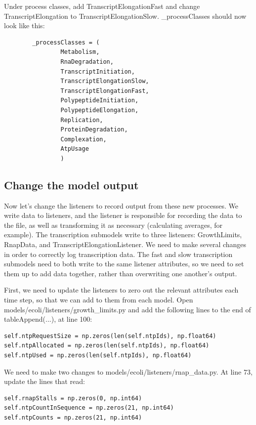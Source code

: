 \documentclass[12pt]{article}
\begin{document}
Under process classes, add TranscriptElongationFast and change TranscriptElongation to TranscriptElongationSlow. \_processClasses should now look like this:


\begin{lstlisting}
        _processClasses = (
                Metabolism,
                RnaDegradation,
                TranscriptInitiation,
                TranscriptElongationSlow,
                TranscriptElongationFast,
                PolypeptideInitiation,
                PolypeptideElongation,
                Replication,
                ProteinDegradation,
                Complexation,
                AtpUsage
                )
\end{lstlisting}

\subsection{Change the model output}

Now let’s change the listeners to record output from these new processes. We write data to listeners, and the listener is responsible for recording the data to the file, as well as transforming it as necessary (calculating averages, for example). The transcription submodels write to three listeners: GrowthLimits, RnapData, and TranscriptElongationListener. We need to make several changes in order to correctly log transcription data. The fast and slow transcription submodels need to both write to the same listener attributes, so we need to set them up to add data together, rather than overwriting one another's output.

First, we need to update the listeners to zero out the relevant attributes each time step, so that we can add to them from each model. Open models/ecoli/listeners/growth_limits.py and add the following lines to the end of tableAppend(...), at line 100:

\lstset{language=Python}
\begin{lstlisting}
self.ntpRequestSize = np.zeros(len(self.ntpIds), np.float64)
self.ntpAllocated = np.zeros(len(self.ntpIds), np.float64)
self.ntpUsed = np.zeros(len(self.ntpIds), np.float64)
\end{lstlisting}

We need to make two changes to models/ecoli/listeners/rnap_data.py. At line 73, update the lines that read:
\lstset{language=Python}
\begin{lstlisting}
self.rnapStalls = np.zeros(0, np.int64)
self.ntpCountInSequence = np.zeros(21, np.int64)
self.ntpCounts = np.zeros(21, np.int64)
\end{lstlisting}
\end{document}
